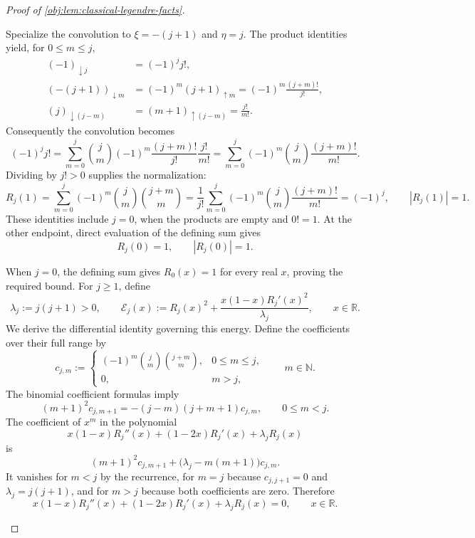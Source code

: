 \documentclass[11pt]{article}
\begin{document}
\begin{proof}[Proof of \cref{obj:lem:classical-legendre-facts}]
\begin{enumerate}
Specialize the convolution to \(\xi=-(j+1)\) and \(\eta=j\). The product identities yield, for \(0\le m\le j\),
\[
\begin{aligned}
(-1)_{\downarrow j}&=(-1)^j j!,\\
(-(j+1))_{\downarrow m}
&=(-1)^m(j+1)_{\uparrow m}
=(-1)^m\frac{(j+m)!}{j!},\\
(j)_{\downarrow(j-m)}
&=(m+1)_{\uparrow(j-m)}
=\frac{j!}{m!}.
\end{aligned}
\]
Consequently the convolution becomes
\[
(-1)^j j!
=\sum_{m=0}^j\binom jm(-1)^m
  \frac{(j+m)!}{j!}\frac{j!}{m!}
=\sum_{m=0}^j(-1)^m\binom jm\frac{(j+m)!}{m!}.
\]
Dividing by \(j!>0\) supplies the normalization:
\[
R_j(1)
=\sum_{m=0}^j(-1)^m\binom jm\binom{j+m}{m}
=\frac{1}{j!}\sum_{m=0}^j(-1)^m\binom jm\frac{(j+m)!}{m!}
=(-1)^j,
\qquad |R_j(1)|=1.
\]
These identities include \(j=0\), when the products are empty and \(0!=1\).
At the other endpoint, direct evaluation of the defining sum gives
\[
R_j(0)=1,
\qquad |R_j(0)|=1.
\]

When \(j=0\), the defining sum gives \(R_0(x)=1\) for every real \(x\), proving the required bound. For \(j\ge1\), define
\[
\lambda_j:=j(j+1)>0,
\qquad
\mathcal E_j(x):=
R_j(x)^2+\frac{x(1-x)R_j'(x)^2}{\lambda_j},
\qquad x\in\mathbb R.
\]
We derive the differential identity governing this energy. Define the coefficients over their full range by
\[
c_{j,m}:=
\begin{cases}
(-1)^m\binom jm\binom{j+m}{m},&0\le m\le j,\\
0,&m>j,
\end{cases}
\qquad m\in\mathbb N.
\]
The binomial coefficient formulas imply
\[
(m+1)^2c_{j,m+1}
=-(j-m)(j+m+1)c_{j,m},
\qquad 0\le m<j.
\]
The coefficient of \(x^m\) in the polynomial
\[
x(1-x)R_j''(x)+(1-2x)R_j'(x)+\lambda_jR_j(x)
\]
is
\[
(m+1)^2c_{j,m+1}
+\bigl(\lambda_j-m(m+1)\bigr)c_{j,m}.
\]
It vanishes for \(m<j\) by the recurrence, for \(m=j\) because \(c_{j,j+1}=0\) and \(\lambda_j=j(j+1)\), and for \(m>j\) because both coefficients are zero. Therefore
\[
x(1-x)R_j''(x)+(1-2x)R_j'(x)+\lambda_jR_j(x)=0,
\qquad x\in\mathbb R.
\]


\end{enumerate}
\end{proof}
\end{document}
